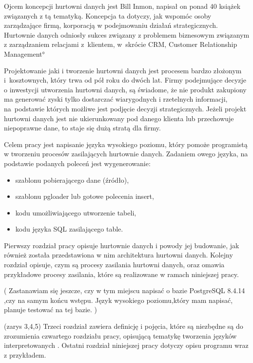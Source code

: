 
Ojcem koncepcji hurtowni danych jest Bill Inmon, napisał on ponad 40 książek związanych z tą tematyką.
Koncepcja ta dotyczy, jak wspomóc osoby zarządzające firmą, korporacją w podejmowaniu działań strategicznych.
Hurtownie danych odniosły sukces związany z  problemem biznesowym związanym z zarządzaniem relacjami z~klientem,
 w~skrócie CRM, \ang{Customer Relationship Management}


Projektowanie jaki i tworzenie hurtowni danych jest procesem bardzo złożonym i~kosztownych, który trwa od pół roku do dwóch lat.
Firmy podejmujące decyzje o inwestycji utworzenia hurtowni danych, są świadome, 
 że nie produkt zakupiony ma generować zyski tylko dostarczać wiarygodnych i rzetelnych informacji, 
 na~podstawie których możliwe jest podjęcie decyzji strategicznych. 
Jeżeli projekt hurtowni danych jest nie ukierunkowany pod danego klienta lub przechowuje niepoprawne dane, 
 to staje się dużą stratą dla firmy.

Celem pracy jest napisanie języka wysokiego poziomu, 
 który pomoże programistą w tworzeniu procesów zasilających hurtownie danych.
 Zadaniem owego języka, na podstawie podanych poleceń jest wygenerowanie:

\begin{itemize}
 \item szablonu pobierającego dane (źródło),
 \item szablonu pgloader lub gotowe polecenia insert,
 \item kodu umożliwiającego utworzenie tabeli,
 \item kodu języka SQL zasilającego table.
\end{itemize}

Pierwszy rozdział pracy opisuje hurtownie danych i powody jej budowanie,
 jak również  została przedstawiona w nim  architektura hurtowni danych.
Kolejny rozdział opisuje, czym są procesy zasilania hurtowni danych, 
 oraz omawia przykładowe procesy zasilania, które są realizowane w ramach niniejszej pracy.


(
Zastanawiam się jeszcze, czy w tym miejscu napisać o bazie PostgreSQL 8.4.14 ,czy na samym końcu wstępu.
Język wysokiego poziomu,który mam napisać, planuje testować na tej bazie. 
)

 
(zarys 3,4,5)
Trzeci rozdział zawiera definicję i pojęcia, które są niezbędne są do 
zrozumienia czwartego rozdziału pracy, opisującą tematykę tworzenia języków interpretowanych .
Ostatni rozdział niniejszej pracy dotyczy opisu programu wraz z przykładem.
  


